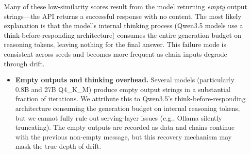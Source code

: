 
Many of these low-similarity scores result from the model returning
\emph{empty} output strings---the API returns a successful response with no
content. The most likely explanation is that the model's internal thinking
process (Qwen3.5 models use a think-before-responding architecture) consumes
the entire generation budget on reasoning tokens, leaving nothing for the
final answer. This failure mode is consistent across seeds and becomes more
frequent as chain inputs degrade through drift.


\begin{itemize}[leftmargin=*]
  \item \textbf{Empty outputs and thinking overhead.} Several models
        (particularly 0.8B and 27B Q4\_K\_M) produce empty output strings
        in a substantial fraction of iterations. We attribute this to
        Qwen3.5's think-before-responding architecture consuming the
        generation budget on internal reasoning tokens, but we cannot
        fully rule out serving-layer issues (e.g., Ollama silently
        truncating). The empty outputs are recorded as data and chains
        continue with the previous non-empty message, but this recovery
        mechanism may mask the true depth of drift.
\end{itemize}

